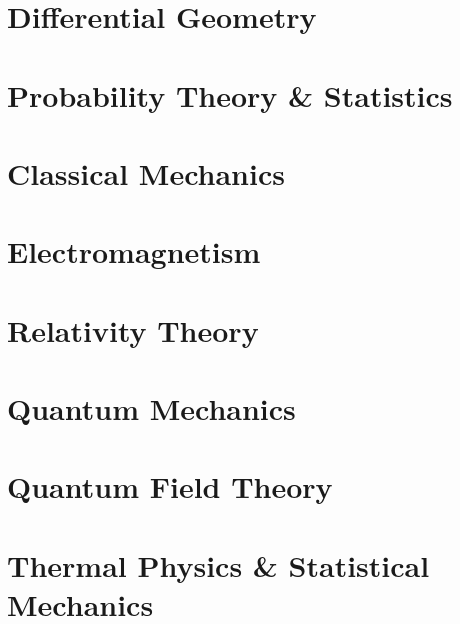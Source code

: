\documentclass[12pt]{report}
\begin{document}
\part{Differential Geometry}











\part{Probability Theory \& Statistics}




\part{Classical Mechanics}







\part{Electromagnetism}




\part{Relativity Theory}


\part{Quantum Mechanics}








\part{Quantum Field Theory}




\part{Thermal Physics \& Statistical Mechanics}


\end{document}
